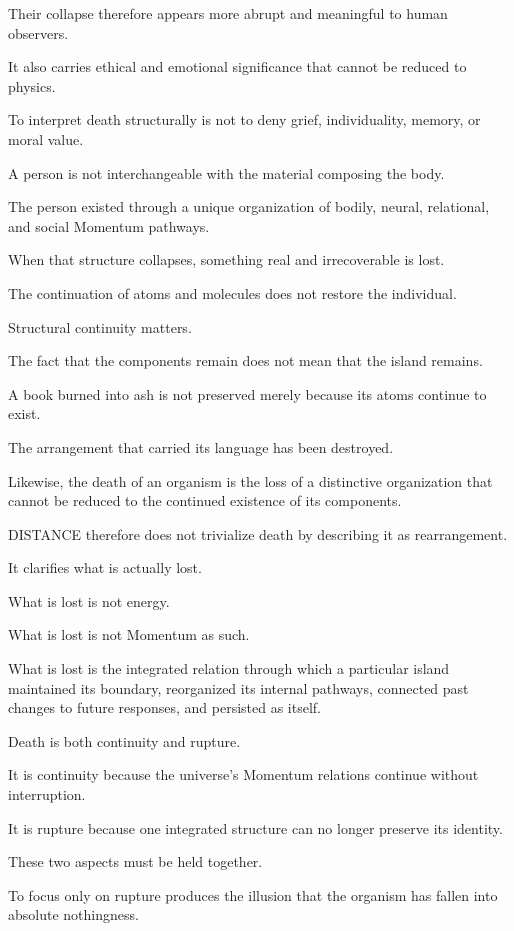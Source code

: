 Their collapse therefore appears more abrupt and meaningful to human observers.

It also carries ethical and emotional significance that cannot be reduced to physics.

To interpret death structurally is not to deny grief, individuality, memory, or moral value.

A person is not interchangeable with the material composing the body.

The person existed through a unique organization of bodily, neural, relational, and social Momentum pathways.

When that structure collapses, something real and irrecoverable is lost.

The continuation of atoms and molecules does not restore the individual.

Structural continuity matters.

The fact that the components remain does not mean that the island remains.

A book burned into ash is not preserved merely because its atoms continue to exist.

The arrangement that carried its language has been destroyed.

Likewise, the death of an organism is the loss of a distinctive organization that cannot be reduced to the continued existence of its components.

DISTANCE therefore does not trivialize death by describing it as rearrangement.

It clarifies what is actually lost.

What is lost is not energy.

What is lost is not Momentum as such.

What is lost is the integrated relation through which a particular island maintained its boundary, reorganized its internal pathways, connected past changes to future responses, and persisted as itself.

Death is both continuity and rupture.

It is continuity because the universe’s Momentum relations continue without interruption.

It is rupture because one integrated structure can no longer preserve its identity.

These two aspects must be held together.

To focus only on rupture produces the illusion that the organism has fallen into absolute nothingness.

